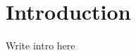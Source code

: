 \section{Introduction}
Write intro here \cite{Project1} \cite{Week35} \cite{Week36}






















